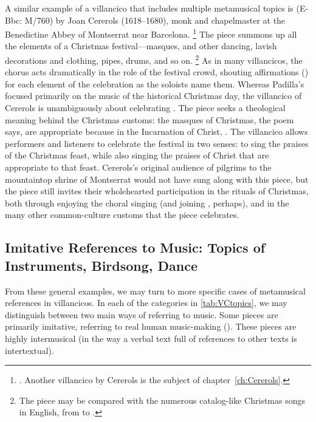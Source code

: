 A similar example of a villancico that includes multiple metamusical topics is  (E-Bbc: M/760) by Joan Cererols (1618--1680), monk and chapelmaster at the Benedictine Abbey of Montserrat near Barcelona.%
	\footnote{%
	\autocite[81--94]{Cererols:MEM-VC}.
	Another villancico by Cererols is the subject of chapter~\ref{ch:Cererols}.
	}
The piece summons up all the elements of a Christmas festival---masques,   and other dancing, lavish decorations and clothing, pipes, drums, and so on.%
	\footnote{%
	The piece may be compared with the numerous catalog-like Christmas songs in English, from  to .
	}
As in many villancicos, the chorus acts dramatically in the role of the festival crowd, shouting affirmations () for each element of the celebration as the soloists name them.
Whereas Padilla's  focused primarily on the music of the historical Christmas day, the villancico of Cererols is unambiguously about celebrating .
The piece seeks a theological meaning behind the Christmas customs: the masques of Christmas, the poem says, are appropriate because in the Incarnation of Christ,  .
The villancico allows performers and listeners to celebrate the festival in two senses: to sing the praises of the Christmas feast, while also singing the praises of Christ that are appropriate to that feast. 
Cererols's original audience of pilgrims to the mountaintop shrine of Montserrat would not have sung along with this piece, but the piece still invites their wholehearted participation in the rituals of Christmas, both through enjoying the choral singing (and joining , perhaps), and in the many other common-culture customs that the piece celebrates.

\subsection{%
Imitative References to Music: Topics of Instruments, Birdsong, Dance
}
From these general examples, we may turn to more specific cases of metamusical references in villancicos.
In each of the categories in \cref{tab:VCtopics}, we may distinguish between two main ways of referring to music.
Some pieces are primarily imitative, referring to real human music-making ().
These pieces are highly intermusical (in the way a verbal text full of references to other texts is intertextual).

